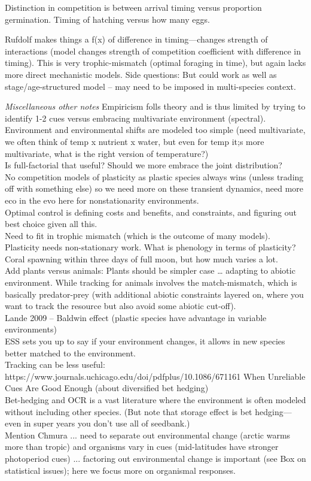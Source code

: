 \documentclass[11pt,letterpaper]{article}
\begin{document}
Distinction in competition is between arrival timing versus proportion germination. Timing of hatching versus how many eggs. 

Rufdolf makes things a f(x) of difference in timing---changes strength of interactions (model changes strength of competition coefficient with difference in timing). This is very trophic-mismatch (optimal foraging in time), but again lacks more direct mechanistic models. Side questions: But could work as well as stage/age-structured model -- may need to be imposed in multi-species context. 

\emph{Miscellaneous other notes}
Empiricism folls theory and is thus limited by trying to identify 1-2 cues versus embracing multivariate environment (spectral). \\
Environment and environmental shifts are modeled too simple (need multivariate, we often think of temp x nutrient x water, but even for temp it;s more multivariate, what is the right version of temperature?)\\
Is full-factorial that useful? Should we more embrace the joint distribution?\\
No competition models of plasticity as plastic species always wins (unless trading off with something else) so we need more on these transient dynamics, need more eco in the evo here for nonstationarity environments. \\
Optimal control is defining costs and benefits, and constraints, and figuring out best choice given all this.\\
Need to fit in trophic mismatch (which is the outcome of many models).\\
Plasticity needs non-stationary work. What is phenology in terms of plasticity?\\
Coral spawning within three days of full moon, but how much varies a lot.\\
Add plants versus animals: Plants should be simpler case  … adapting to abiotic environment. While tracking for animals involves the match-mismatch, which is basically predator-prey (with additional abiotic constraints layered on, where you want to track the resource but also avoid some abiotic cut-off). \\
Lande 2009 -- Baldwin effect (plastic species have advantage in variable environments) \\
ESS sets you up to say if your environment changes, it allows in new species better matched to the environment. \\
Tracking can be less useful: https://www.journals.uchicago.edu/doi/pdfplus/10.1086/671161 When Unreliable Cues Are Good Enough (about diversified bet hedging)\\
Bet-hedging and OCR is a vast literature where the environment is often modeled without including other species. (But note that storage effect is bet hedging---even in super years you don't use all of seedbank.)\\
Mention Chmura ... need to separate out environmental change (arctic warms more than tropic) and organisms vary in cues (mid-latitudes have stronger photoperiod cues) ... factoring out environmental change is important (see Box on statistical issues); here we focus more on organismal responses. 
\end{document}
